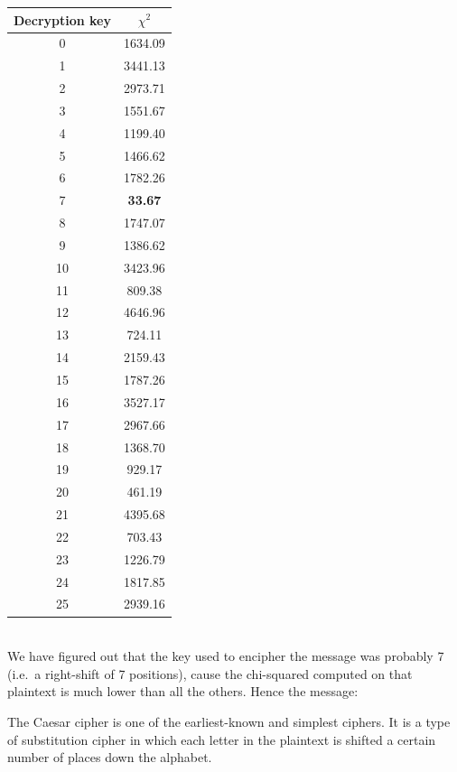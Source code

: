 \documentclass[Lau,binding=0.6cm,oneside]{sapthesis}
\begin{document}
\begin{center}
 \begin{tabular}{||c c||} 
 \hline
 Decryption key & $\chi^{2}$\\ [0.3ex] 
 \hline\hline
 0 & 1634.09\\
 \hline
 1 & 3441.13\\
 \hline
 2 & 2973.71\\
 \hline
 3 & 1551.67\\
 \hline
 4 & 1199.40\\
 \hline
 5 & 1466.62\\
 \hline
 6 & 1782.26\\
 \hline
 7 & \textbf{33.67}\\
 \hline
 8 & 1747.07\\
 \hline
 9 & 1386.62\\
 \hline
 10 & 3423.96\\
 \hline
 11 & 809.38\\
 \hline
 12 & 4646.96\\
 \hline
 13 & 724.11\\
 \hline
 14 & 2159.43\\
 \hline
 15 & 1787.26\\
 \hline
 16 & 3527.17\\
 \hline
 17 & 2967.66\\
 \hline
 18 & 1368.70\\
 \hline
 19 & 929.17\\
 \hline
 20 & 461.19\\
 \hline
 21 & 4395.68\\
 \hline
 22 & 703.43\\
 \hline
 23 & 1226.79\\
 \hline
 24 & 1817.85\\
 \hline
 25 & 2939.16\\
 \hline
\end{tabular}
\end{center}
\ \\
We have figured out that the key used to encipher the message was probably 7 (i.e.\ a right-shift of 7 positions), cause the chi-squared computed on that plaintext is much lower than all the others. Hence the message:

\begin{displayquote}{\small{\textsf{The Caesar cipher is one of the earliest-known and simplest ciphers. It is a type of substitution cipher in which each letter in the plaintext is shifted a certain number of places down the alphabet.}}}
\end{displayquote}
\end{document}
